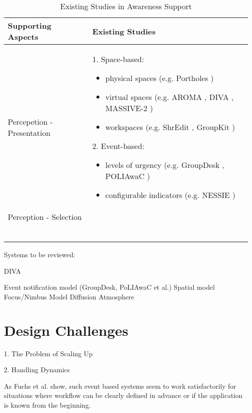 {\footnotesize
\begin{longtable}{>{\raggedright}p{1.2in}>{\raggedright}p{4.3in}}

\toprule 
\textbf{Supporting Aspects} & \textbf{Existing Studies}\tabularnewline
\midrule 
Percepetion - Presentation & 1. Space-based: 
\begin{itemize}
\item physical spaces (e.g. Portholes \cite{Dourish1992})
\item virtual spaces (e.g. AROMA \cite{Pedersen1997}, DIVA
\cite{Berlage1999}, MASSIVE-2 \cite{Benford2001})
\item workspaces (e.g. ShrEdit \cite{dourish1992awareness},
GroupKit \cite{Roseman1996})
\end{itemize}
2. Event-based:
\begin{itemize}
\item levels of urgency (e.g. GroupDesk \cite{Fuchs1995},
POLIAwaC \cite{sohlenkamp2000po})
\item configurable indicators (e.g. NESSIE \cite{prinz1999a})\end{itemize}
\tabularnewline
\midrule 
Perception - Selection & \tabularnewline
\midrule 
 & \tabularnewline
\midrule 
 & \tabularnewline
\midrule 
 & \tabularnewline
\midrule 
 & \tabularnewline
\midrule 
 & \tabularnewline
\bottomrule

\caption{Existing Studies in Awareness Support}
\label{tab:existing_studies}
\end{longtable}}


Systems to be reviewed:

DIVA \cite{springerlink:10.1023/A:1008608425504}

Event notification model (GroupDesk, PoLIAwaC et al.)
Spatial model
Focus/Nimbus Model
Diffusion
Atmosphere



\section{Design Challenges} %
\label{sec:design_challenges}
1. The Problem of Scaling Up

2. Handling Dynamics

As Fuchs et al. show, such event based systems seem to work satisfactorily for situations where workflow can be clearly defined in advance or if the application is known from the beginning.


